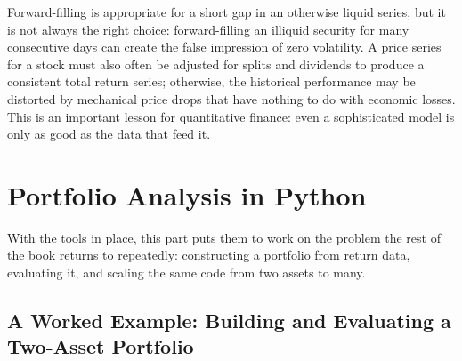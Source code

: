 \documentclass[../ai_in_finance]{subfiles}
\begin{document}
\begin{figure}[htb]
\centering
\begin{lrbox}{\bookmeasuredbox}
\end{lrbox}
\ifdim\wd\bookmeasuredbox<0.65\linewidth
\setlength{\bookcapwidth}{0.65\linewidth}
\else
\setlength{\bookcapwidth}{\wd\bookmeasuredbox}
\fi
{}
\end{figure}

Forward-filling is appropriate for a short gap in an otherwise liquid series, but it is not always the right choice: forward-filling an illiquid security for many consecutive days can create the false impression of zero volatility. A price series for a stock must also often be adjusted for splits and dividends to produce a consistent total return series; otherwise, the historical performance may be distorted by mechanical price drops that have nothing to do with economic losses. This is an important lesson for quantitative finance: even a sophisticated model is only as good as the data that feed it.

\section{Portfolio Analysis in Python}

With the tools in place, this part puts them to work on the problem the rest of the book returns to repeatedly: constructing a portfolio from return data, evaluating it, and scaling the same code from two assets to many.

\subsection{A Worked Example: Building and Evaluating a Two-Asset Portfolio}
\label{sec:worked-example}
\end{document}
